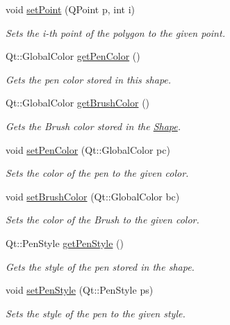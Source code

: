 \begin{DoxyCompactItemize}
void \hyperlink{classPolygon_a19e111329052166c5eeb2d6933066774}{set\+Point} (Q\+Point p, int i)
\begin{DoxyCompactList}\small\item\em Sets the i-\/th point of the polygon to the given point. \end{DoxyCompactList}\item 
Qt\+::\+Global\+Color \hyperlink{classPolygon_a495a1a0d772def2064a1c19762b769c2}{get\+Pen\+Color} ()
\begin{DoxyCompactList}\small\item\em Gets the pen color stored in this shape. \end{DoxyCompactList}\item 
Qt\+::\+Global\+Color \hyperlink{classPolygon_a201ddc5bb4071243ec497028f70b6d51}{get\+Brush\+Color} ()
\begin{DoxyCompactList}\small\item\em Gets the Brush color stored in the \hyperlink{classShape}{Shape}. \end{DoxyCompactList}\item 
void \hyperlink{classPolygon_aa5e4c1ec34f061e201ab5ff38b55f945}{set\+Pen\+Color} (Qt\+::\+Global\+Color pc)
\begin{DoxyCompactList}\small\item\em Sets the color of the pen to the given color. \end{DoxyCompactList}\item 
void \hyperlink{classPolygon_a09d905fcc1c8fd0b25772d54d1d5c831}{set\+Brush\+Color} (Qt\+::\+Global\+Color bc)
\begin{DoxyCompactList}\small\item\em Sets the color of the Brush to the given color. \end{DoxyCompactList}\item 
Qt\+::\+Pen\+Style \hyperlink{classPolygon_ad17a682e3a31c185086a56ac36b1a732}{get\+Pen\+Style} ()
\begin{DoxyCompactList}\small\item\em Gets the style of the pen stored in the shape. \end{DoxyCompactList}\item 
void \hyperlink{classPolygon_afd47f455b19d368bea8a198d4fcfa81f}{set\+Pen\+Style} (Qt\+::\+Pen\+Style ps)
\begin{DoxyCompactList}\small\item\em Sets the style of the pen to the given style. \end{DoxyCompactList}\item 

\end{DoxyCompactItemize}
